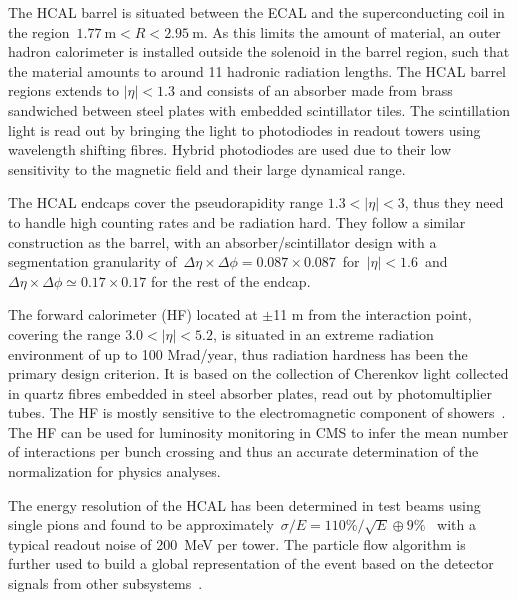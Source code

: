 The HCAL barrel is situated between the ECAL and the superconducting coil in the region~$1.77~\mathrm{m} < R < 2.95~\mathrm{m}$. As this limits the amount of material, an outer hadron calorimeter is installed outside the solenoid in the barrel region, such that the material amounts to around 11 hadronic radiation lengths. The HCAL barrel regions extends to $|\eta| < 1.3$ and consists of an absorber made from brass sandwiched between steel plates with embedded scintillator tiles. The scintillation light is read out by bringing the light to photodiodes in readout towers using wavelength shifting fibres. Hybrid photodiodes are used due to their low sensitivity to the magnetic field and their large dynamical range.

The HCAL endcaps cover the pseudorapidity range $1.3 < |\eta| < 3$, thus they need to handle high counting rates and be radiation hard. They follow a similar construction as the barrel, with an absorber/scintillator design with a segmentation granularity of~$\Delta \eta \times \Delta \phi = 0.087 \times 0.087$~for~$|\eta| < 1.6$~and~$\Delta \eta \times \Delta \phi \simeq 0.17 \times 0.17$ for the rest of the endcap.

The forward calorimeter (HF) located at $\pm$11 m from the interaction point, covering the range $3.0 < |\eta| < 5.2$, is situated in an extreme radiation environment of up to 100 Mrad/year, thus radiation hardness has been the primary design criterion. It is based on the collection of Cherenkov light collected in quartz fibres embedded in steel absorber plates, read out by photomultiplier tubes. The HF is mostly sensitive to the electromagnetic component of showers~\cite{Akchurin:2003tp}. The HF can be used for luminosity monitoring in CMS to infer the mean number of interactions per bunch crossing and thus an accurate determination of the normalization for physics analyses.

The energy resolution of the HCAL has been determined in test beams using single pions and found to be approximately~$\sigma/E = 110\%/\sqrt{E} \oplus 9\%$~\cite{Elvira:2004iya} with a typical readout noise of 200~MeV per tower. The particle flow algorithm is further used to build a global representation of the event based on the detector signals from other subsystems~\cite{CMS-PRF-14-001}.

